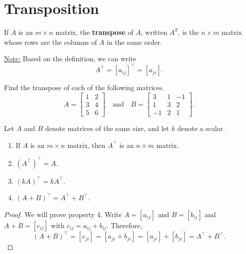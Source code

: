 \documentclass[20pt,a4paper]{extarticle}
\newcounter{example}[section]
\newcounter{theorem}
\newcounter{definition}[section]
\begin{document}
\newpage

\section{Transposition}

\begin{definition}
If $A$ is an $m \times n$ matrix, the \textbf{transpose} of $A$, written $A^T$, is the $n \times m$ matrix whose rows are the columns of $A$ in the same order.
\end{definition}

\underline{Note:} Based on the definition, we can write
	\[
		A^\top = [a_{ij}]^{\top} = [a_{ji}] .
	\]

\begin{example}
Find the transpose of each of the following matrices.
	\[
		A = \begin{bmatrix} 1 & 2 \\ 3 & 4 \\ 5 & 6 \end{bmatrix} \quad \text{and} \quad B = \begin{bmatrix} 3 & 1 & -1 \\ 1 & 3 & 2 \\ -1 & 2 & 1 \end{bmatrix} .
	\]
\end{example}

\begin{solution}

\end{solution}

\newpage 

\begin{theorem}
Let $A$ and $B$ denote matrices of the same size, and let $k$ denote a scalar.
\begin{enumerate}
	\item If $A$ is an $m \times n$ matrix, then $A^{\top}$ is an $n \times m$ matrix.
	\item $(A^\top)^\top = A$.
	\item $(k A)^\top = k A^\top$.
	\item $(A + B)^\top = A^\top + B^\top$.
\end{enumerate}
\end{theorem}

\begin{proof}
We will prove property 4. Write $A = [a_{ij}]$ and $B = [b_{ij}]$ and $A + B = [c_{ij}]$ with $c_{ij} = a_{ij} + b_{ij}$. Therefore,
	\[
		(A + B)^\top = [c_{ji}] = [a_{ji} + b_{ji}] = [a_{ji}] + [b_{ji}] = A^\top + B^\top . \tag*{$\square$} 
	\]
\end{proof}
\end{document}
